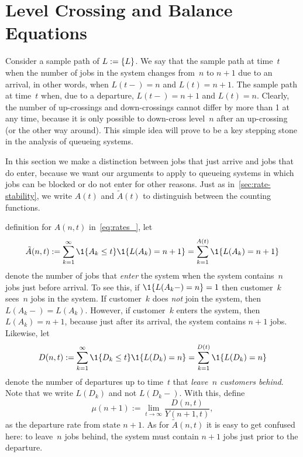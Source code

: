 \documentclass[queueing-book.tex]{subfiles}
\begin{document}
\section{Level Crossing and Balance Equations}
\label{sec:level-cross-balance}

Consider a sample path
of $L:=\{L\}$.
We say that the sample path  at time~$t$ when the number of jobs in the system changes from~$n$ to $n+1$ due to an arrival, in other words, when $L(t-)=n$ and $L(t)=n+1$.
The sample path  at time~$t$ when, due to a departure, $L(t-)=n+1$ and $L(t)=n$.
Clearly, the number of up-crossings and down-crossings cannot differ by more than 1 at any time, because it is only possible to down-cross level~$n$ after an up-crossing (or the other way around).
This simple idea will prove to be a key stepping stone in the analysis of queueing systems.

In this section we make a distinction between jobs that just arrive and jobs that do enter, because we want our arguments to apply to queueing systems in which jobs can be blocked or do not enter for other reasons.
Just as in~\cref{sec:rate-stability}, we write $A(t)$ and $\tilde A(t)$ to distinguish between the counting functions.


 definition for $A(n,t)$ in~\cref{eq:rates_}, let
\begin{equation*}\label{eq:102}
 \tilde A(n,t) :=  \sum_{k=1}^\infty \1{A_k \leq t} \1{\L(A_k) = n+1} = \sum_{k=1}^{A(t)} \1{\L(A_k) = n+1}
 \end{equation*}
 denote the number of jobs that \emph{enter} the system when the system contains~$n$ jobs just before arrival.
To see this, if $\1{L(A_{k}-) = n}=1$ then customer~$k$ sees~$n$ jobs in the system. If customer~$k$ does \emph{not} join the system, then $L(A_{k}-) = L(A_{k})$. However, if customer~$k$ enters the system, then $L(A_{k})=n+1$, because just after its arrival, the system contains $n+1$ jobs.
Likewise, let
\begin{equation*}
 D(n,t) :=  \sum_{k=1}^\infty \1{D_k \leq t} \1{\L(D_k) = n} = \sum_{k=1}^{D(t)} \1{\L(D_k) = n}
 \end{equation*}
 denote the number of departures up to time~$t$ that\emph{ leave~$n$ customers behind}.
Note that we write $L(D_{k})$ and not $L(D_{k}-)$.
With this, define
\begin{equation*}
 \mu(n+1) := \lim_{t\to\infty} \frac{D(n,t)}{Y(n+1,t)},
\end{equation*}
as the departure rate from state $n+1$.
As for $\tilde A(n,t)$ it is easy to get confused here: to leave~$n$ jobs behind, the system must contain $n+1$ jobs just prior to the departure.
\end{document}
